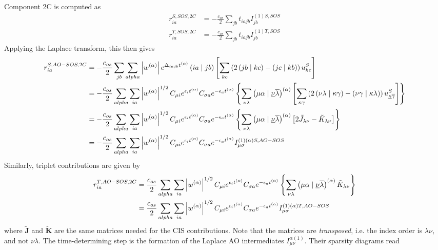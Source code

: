 Component 2C is computed as
\begin{align}
r_{ia}^{S,SOS,2C} &= -\frac{c_{os}}{2} \sum_{jb} t_{iajb} I^{(1)S,SOS}_{jb} \\
r_{ia}^{T,SOS,2C} &= -\frac{c_{os}}{2} \sum_{jb} t_{iajb} I^{(1)T,SOS}_{jb}
\end{align}
\noindent Applying the Laplace transform, this then gives
\begin{align}
\begin{split}
r_{ia}^{S,AO-SOS,2C} &= -\frac{c_{os}}{2} \sum_{jb} \sum_{alpha} \left\lvert w^{(\alpha)} \right\rvert e^{\Delta_{iajb}t^{(\alpha)}} \left( ia \mid jb \right) \left[\sum_{kc} \left(2\left( jb \mid kc \right) - \left( jc \mid kb \right) \right) u_{kc}^S \right] \\
&=  -\frac{c_{os}}{2} \sum_{alpha} \sum_{ia} \left\lvert w^{(\alpha)} \right\rvert^{1/2} C_{\mu i} e^{\epsilon_i t^{(\alpha)}} C_{\sigma a} e^{-\epsilon_a t^{(\alpha)}} \left\lbrace \sum_{\nu\lambda} \left( \mu\alpha \mid \underline{\nu}\overline{\lambda} \right)^{(\alpha)} \left[ \sum_{\kappa\gamma}  \left( 2\left( \nu\lambda \mid \kappa\gamma \right) - \left( \nu\gamma \mid \kappa\lambda \right)\right) u^S_{\underline{\kappa}\overline{\gamma}} \right] \right\rbrace \\
&=   -\frac{c_{os}}{2} \sum_{alpha} \sum_{ia} \left\lvert w^{(\alpha)} \right\rvert^{1/2} C_{\mu i} e^{\epsilon_i t^{(\alpha)}} C_{\sigma a} e^{-\epsilon_a t^{(\alpha)}} \left\lbrace \sum_{\nu\lambda} \left( \mu\alpha \mid \underline{\nu}\overline{\lambda} \right)^{(\alpha)} \left[ 2\tilde{J}_{\lambda\nu} - \tilde{K}_{\lambda\nu} \right] \right\rbrace \\
&= -\frac{c_{os}}{2} \sum_{alpha} \sum_{ia} \left\lvert w^{(\alpha)} \right\rvert^{1/2} C_{\mu i} e^{\epsilon_i t^{(\alpha)}} C_{\sigma a} e^{-\epsilon_a t^{(\alpha)}} I^{(1)(\alpha)S,AO-SOS}_{\mu \sigma}
\end{split} 
\end{align}
\noindent Similarly, triplet contributions are given by
\begin{align}
\begin{split}
r_{ia}^{T,AO-SOS,2C} &= \frac{c_{os}}{2} \sum_{alpha} \sum_{ia} \left\lvert w^{(\alpha)} \right\rvert^{1/2} C_{\mu i} e^{\epsilon_i t^{(\alpha)}} C_{\sigma a} e^{-\epsilon_a t^{(\alpha)}} \left\lbrace \sum_{\nu\lambda} \left( \mu\alpha \mid \underline{\nu}\overline{\lambda} \right)^{(\alpha)} \tilde{K}_{\lambda\nu} \right\rbrace \\
&= \frac{c_{os}}{2} \sum_{alpha} \sum_{ia} \left\lvert w^{(\alpha)} \right\rvert^{1/2} C_{\mu i} e^{\epsilon_i t^{(\alpha)}} C_{\sigma a} e^{-\epsilon_a t^{(\alpha)}} I^{(1)(\alpha)T,AO-SOS}_{\mu \sigma}
\end{split}
\end{align}
\noindent where $\mathbf{\tilde{J}}$ and $\mathbf{\tilde{K}}$ are the same matrices needed for the CIS contributions. Note that the matrices are \emph{transposed}, i.e. the index order is $\lambda\nu$, and not $\nu\lambda$. The time-determining step is the formation of the Laplace AO intermediates $I_{\mu\nu}^{\alpha(1)}$. Their sparsity diagrams read
